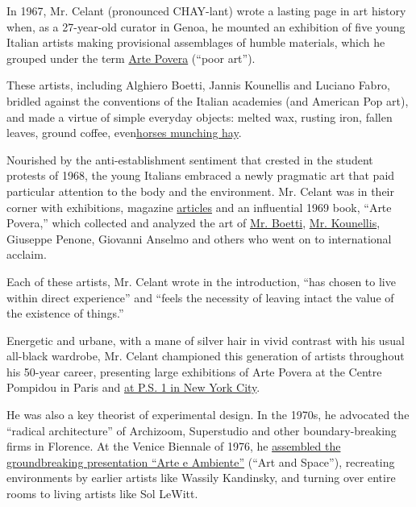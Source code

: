 In 1967, Mr. Celant (pronounced CHAY-lant) wrote a lasting page in art
history when, as a 27-year-old curator in Genoa, he mounted an
exhibition of five young Italian artists making provisional assemblages
of humble materials, which he grouped under the term
\href{https://www.moma.org/collection/terms/7}{Arte Povera} (``poor
art'').

These artists, including Alghiero Boetti, Jannis Kounellis and Luciano
Fabro, bridled against the conventions of the Italian academies (and
American Pop art), and made a virtue of simple everyday objects: melted
wax, rusting iron, fallen leaves, ground coffee,
even\href{https://www.nytimes3xbfgragh.onion/2015/06/26/arts/design/review-art-that-snorts-from-jannis-kounellis-at-gavin-browns-enterprise.html}{horses
munching hay}.

Nourished by the anti-establishment sentiment that crested in the
student protests of 1968, the young Italians embraced a newly pragmatic
art that paid particular attention to the body and the environment. Mr.
Celant was in their corner with exhibitions, magazine
\href{https://flash---art.com/article/germano-celant-arte-povera-notes-on-a-guerrilla-war/}{articles}
and an influential 1969 book, ``Arte Povera,'' which collected and
analyzed the art of
\href{https://www.nytimes3xbfgragh.onion/2012/06/29/arts/design/alighiero-boetti-retrospective-at-museum-of-modern-art.html}{Mr.
Boetti},
\href{https://www.nytimes3xbfgragh.onion/2017/02/21/arts/design/jannis-kounellis-died-sculptor.html}{Mr.
Kounellis}, Giuseppe Penone, Giovanni Anselmo and others who went on to
international acclaim.

Each of these artists, Mr. Celant wrote in the introduction, ``has
chosen to live within direct experience'' and ``feels the necessity of
leaving intact the value of the existence of things.''

Energetic and urbane, with a mane of silver hair in vivid contrast with
his usual all-black wardrobe, Mr. Celant championed this generation of
artists throughout his 50-year career, presenting large exhibitions of
Arte Povera at the Centre Pompidou in Paris and
\href{https://www.nytimes3xbfgragh.onion/1985/10/13/arts/conceptual-art-italian-style-makes-a-statement-at-ps-1.html}{at
P.S. 1 in New York City}.

He was also a key theorist of experimental design. In the 1970s, he
advocated the ``radical architecture'' of Archizoom, Superstudio and
other boundary-breaking firms in Florence. At the Venice Biennale of
1976, he
\href{https://www.nytimes3xbfgragh.onion/1976/07/25/archives/the-biennale-a-show-of-compromises.html}{assembled
the groundbreaking presentation ``Arte e Ambiente''} (``Art and
Space''), recreating environments by earlier artists like Wassily
Kandinsky, and turning over entire rooms to living artists like Sol
LeWitt.

